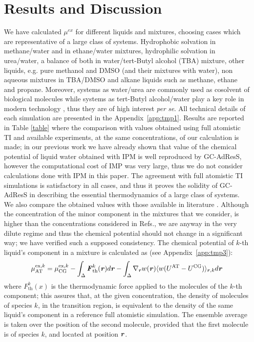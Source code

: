\documentclass[a4paper,preprint,unsortedaddress]{revtex4-1}
\newcommand{\recheck}[1]{{\color{red} #1}}
\newcommand{\vect}[1]{\textbf{\textit{#1}}}
\newcommand{\AT}{{\textrm{{AT}}}}
\newcommand{\CG}{{\textrm{CG}}}
\newcommand{\thf}{{\textrm{th}}}
\newcommand{\exc}{{\textrm{ex}}}
\begin{document}
\section{Results and Discussion}
We have calculated $\mu^{ex}$ for different liquids and mixtures, choosing cases which are representative of a large class of systems. Hydrophobic solvation in methane/water and in ethane/water mixtures, hydrophilic solvation in urea/water, a balance of both in water/tert-Butyl alcohol (TBA) mixture, other liquids, e.g. pure methanol and DMSO (and their mixtures with water), non aqueous mixtures in TBA/DMSO and alkane liquids such as methane, ethane and propane. Moreover, systems as water/urea are commonly used as cosolvent of biological molecules \cite{nico-debashish} while systems as tert-Butyl alcohol/water play a key role in modern technology \cite{irata}, thus they are of high interest {\it per se}. All technical details of each simulation are presented in the Appendix~\ref{app:tmp1}.
Results are reported in Table \ref{table} where the comparison with values obtained using full atomistic TI and available experiments, at the same concentrations, of our calculation is made; in our previous work we have already shown that value of the chemical potential of liquid water obtained with IPM is well reproduced by GC-AdResS, however the computational cost of IMP was very large, thus we do not consider calculations done with IPM in this paper. 
The agreement with full atomistic TI simulations is satisfactory in all cases, and thus it proves the solidity of GC-AdResS in describing the essential thermodynamics of a large class of systems.
We also compare the obtained values with those available in literature \cite{vang,nico}. Although the concentration of the minor component in the mixtures that we consider, is higher than the concentrations considered in Refs.\cite{vang,nico}, we are anyway in the very dilute regime and thus the chemical potential should not change in a significant way; we have verified  such a supposed consistency. 
The chemical potential of $k$-th liquid's component in a mixture is calculated as \recheck{(see Appendix~\ref{app:tmp3})}:
\begin{equation}
  \mu^{\exc,k}_{\AT}=
  \mu^{\exc,k}_{\CG}-
  \int_{\Delta}{\vect F}^k_{\thf}({\vect r})d{\vect r}-
  \int_{\Delta}\nabla_{\vect r} w(\vect r) \langle w(U^{\AT}-U^{\CG})\rangle_{\vect r, k} d{\vect r}
\label{eqn:tmp25}
\end{equation}
where ${F}^{k}_{\thf}(x)$ is the thermodynamic force applied to the molecules of the $k$-th component; this assures that, at the given concentration, the density of molecules of species $k$, in the transition region, is equivalent to the density of the same liquid's component in a reference full atomistic simulation.
\recheck{The ensemble average is taken over the position of the second molecule, provided that the first molecule is of species $k$, and located at position $\vect r$}.
\end{document}
